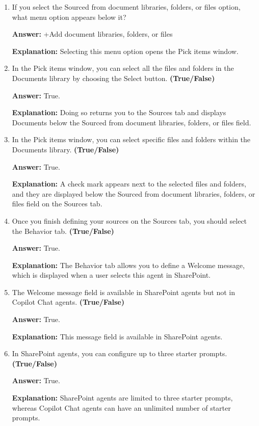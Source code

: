 \documentclass[10pt]{article}
\begin{document}
\begin{enumerate}[leftmargin=*]
\item If you select the Sourced from document libraries, folders, or files option, what menu option appears below it?

\textbf{Answer:} +Add document libraries, folders, or files

\textbf{Explanation:} Selecting this menu option opens the Pick items window.

\item In the Pick items window, you can select all the files and folders in the Documents library by choosing the Select button. \textbf{(True/False)}

\textbf{Answer:} True.

\textbf{Explanation:} Doing so returns you to the Sources tab and displays Documents below the Sourced from document libraries, folders, or files field.

\item In the Pick items window, you can select specific files and folders within the Documents library. \textbf{(True/False)}

\textbf{Answer:} True.

\textbf{Explanation:} A check mark appears next to the selected files and folders, and they are displayed below the Sourced from document libraries, folders, or files field on the Sources tab.

\item Once you finish defining your sources on the Sources tab, you should select the Behavior tab. \textbf{(True/False)}

\textbf{Answer:} True.

\textbf{Explanation:} The Behavior tab allows you to define a Welcome message, which is displayed when a user selects this agent in SharePoint.

\item The Welcome message field is available in SharePoint agents but not in Copilot Chat agents. \textbf{(True/False)}

\textbf{Answer:} True.

\textbf{Explanation:} This message field is available in SharePoint agents.

\item In SharePoint agents, you can configure up to three starter prompts. \textbf{(True/False)}

\textbf{Answer:} True.

\textbf{Explanation:} SharePoint agents are limited to three starter prompts, whereas Copilot Chat agents can have an unlimited number of starter prompts.


\end{enumerate}
\end{document}
